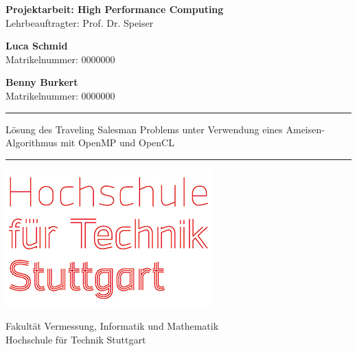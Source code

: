 \begin{titlepage}
    \begin{center}
        \vspace*{1cm}

        \textbf{Projektarbeit: High Performance Computing}\\
        Lehrbeauftragter: Prof. Dr. Speiser

        \vspace{2cm}

        \textbf{Luca Schmid} \\
        Matrikelnummer: 0000000

        \textbf{Benny Burkert} \\
        Matrikelnummer: 0000000
        
        \vspace{4cm}
        \rule[0.3cm]{\textwidth}{0.4pt}
        Lösung des Traveling Salesman Problems unter Verwendung eines Ameisen-Algorithmus mit OpenMP und OpenCL
        \rule{\textwidth}{0.4pt}
        \vspace{2.5cm}

        \includegraphics[scale=0.5]{images/hft-logo.jpg}
        
        \vspace{0.5cm}

        Fakultät Vermessung, Informatik und Mathematik\\
        Hochschule für Technik Stuttgart\\

    \end{center}   
\end{titlepage}